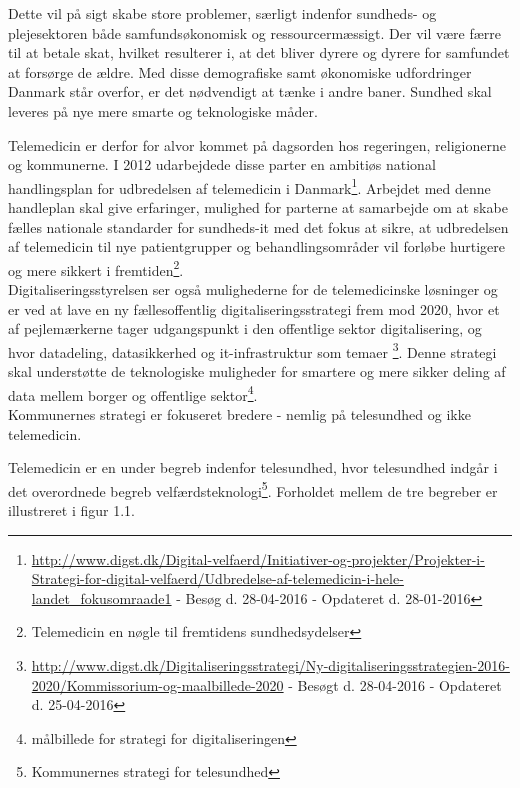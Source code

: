 Dette vil på sigt skabe store problemer, særligt indenfor sundheds- og plejesektoren både samfundsøkonomisk og ressourcermæssigt. Der vil være færre til at betale skat, hvilket resulterer i, at det bliver dyrere og dyrere for samfundet at forsørge de ældre. Med disse demografiske samt økonomiske udfordringer Danmark står overfor, er det nødvendigt at tænke i andre baner. Sundhed skal leveres på nye mere smarte og teknologiske måder.        

Telemedicin er derfor for alvor kommet på dagsorden hos regeringen, religionerne og kommunerne. I 2012 udarbejdede disse parter en ambitiøs national handlingsplan for udbredelsen af telemedicin i Danmark\footnote{\url{http://www.digst.dk/Digital-velfaerd/Initiativer-og-projekter/Projekter-i-Strategi-for-digital-velfaerd/Udbredelse-af-telemedicin-i-hele-landet_fokusomraade1} - Besøg d. 28-04-2016 - Opdateret d. 28-01-2016}. Arbejdet med denne handleplan skal give erfaringer, mulighed for parterne at samarbejde om at skabe fælles nationale standarder for sundheds-it med det fokus at sikre, at udbredelsen af telemedicin til nye patientgrupper og behandlingsområder vil forløbe hurtigere og mere sikkert i fremtiden\footnote{Telemedicin en nøgle til fremtidens sundhedsydelser}. \\
Digitaliseringsstyrelsen ser også mulighederne for de telemedicinske løsninger og er ved at lave en ny fællesoffentlig digitaliseringsstrategi frem mod 2020, hvor et af pejlemærkerne tager udgangspunkt i den offentlige sektor digitalisering, og hvor datadeling, datasikkerhed og it-infrastruktur som temaer \footnote{\url{http://www.digst.dk/Digitaliseringsstrategi/Ny-digitaliseringsstrategien-2016-2020/Kommissorium-og-maalbillede-2020} - Besøgt d. 28-04-2016 - Opdateret d. 25-04-2016}. Denne strategi skal understøtte de teknologiske muligheder for smartere og mere sikker deling af data mellem borger og offentlige sektor\footnote{målbillede for strategi for digitaliseringen}.\\
Kommunernes strategi er fokuseret bredere - nemlig på telesundhed og ikke telemedicin.

Telemedicin er en under begreb indenfor telesundhed, hvor telesundhed indgår i det overordnede begreb velfærdsteknologi\footnote{Kommunernes strategi for telesundhed}. Forholdet mellem de tre begreber er illustreret i figur 1.1. 

